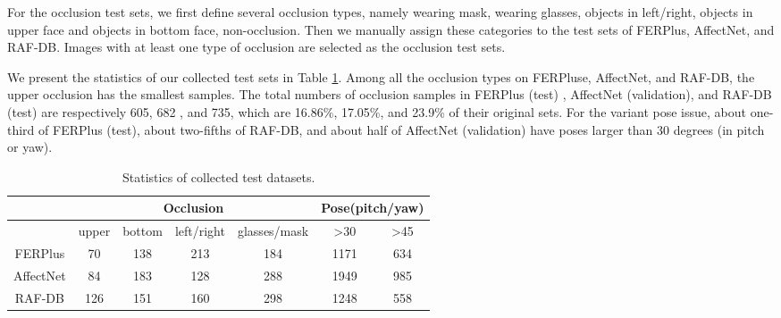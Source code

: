 \documentclass[journal]{IEEEtran}
\newcommand{\kwang}[1]{\textcolor[rgb]{0,0,0}{#1}}
\begin{document}
For the occlusion test sets, we first define several occlusion types, namely wearing mask, wearing glasses, objects in left/right, objects in upper face and objects in bottom face, non-occlusion. \kwang{Then we manually assign these categories to the test sets of FERPlus, AffectNet, and RAF-DB.} Images with at least one type of occlusion are selected as the occlusion test sets.

\kwang{We present the statistics of our collected test sets in Table \ref{tab:stat}. Among all the occlusion types on FERPluse, AffectNet, and RAF-DB, the upper occlusion has the smallest samples. The total numbers of occlusion samples in FERPlus (test) , AffectNet (validation), and RAF-DB (test) are respectively 605, 682 , and 735, which are 16.86\%, 17.05\%, and 23.9\% of their original sets. For the variant pose issue, about one-third of FERPlus (test), about two-fifths of RAF-DB, and about half of AffectNet (validation) have poses larger than 30 degrees (in pitch or yaw).}





\begin{table}[!t]
\centering
\caption{\textcolor[rgb]{0.00,0.00,0.00}{Statistics of collected test datasets.}}
\scriptsize
\begin{tabular}{@{}ccccccc@{}}
\hline
\toprule
                     & \multicolumn{4}{c}{Occlusion}                                                             & \multicolumn{2}{c}{Pose(pitch/yaw)}                                           \\ \midrule
                     & upper                & bottom               & left/right           & glasses/mask         & \textgreater{}30     & \textgreater{}45       \\
FERPlus              &          70            &         138             &                   213   &            184          &       1171    &   634       \\
AffectNet            &        84 &            183 &           128           &    288                  &          1949            &          985            \\
RAF-DB            &        126 &            151 &           160           &    298                  &          1248            &          558            \\
\bottomrule
\hline
\end{tabular}
\label{tab:stat}
\end{table}
 
\end{document}
